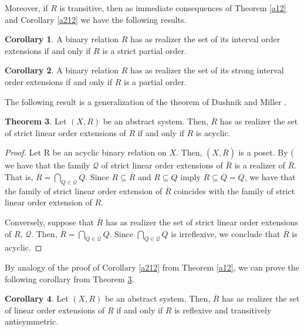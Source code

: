 \documentclass{article}
\theoremstyle{definition}
\newtheorem{theorem}{Theorem}[section]
\newtheorem{corollary}[theorem]{Corollary}
\begin{document}
Moreover, if $R$ is transitive, then
as immediate consequences of Theorem \ref{a12} and Corollary \ref{a212} we have the following results.


\begin{corollary}\label{a72}
A binary relation $R$ has as realizer the set of its interval order extensions if and only if $R$ is a strict partial order.  
\end{corollary}

\begin{corollary}\label{a721}
A binary relation $R$ has as realizer the set of its strong interval order extensions if and only if $R$ is a partial order.  
\end{corollary}

The following result is 
a generalization of 
the theorem of Dushnik and Miller \cite{DM}.








\begin{theorem}\label{a572} Let $(X,R)$ be an abstract system. Then,
$\overline{R}$ has as realizer the set of strict linear order extensions of $R$ if and only if $R$ is acyclic.   
\end{theorem}
\begin{proof}
Let R be an acyclic binary relation on $X$.
Then, $(X,\overline{R})$ is a poset. By (\cite[Theorem 2.32]{DM}
we have that the family
$\mathcal{Q}$ of
strict linear order extensions of $\overline{R}$ is a realizer of $\overline{R}$. That is,
$\overline{R}=\displaystyle\bigcap_{Q\in \mathcal{Q}}Q$. 
Since $R\subseteq \overline{R}$ and $R\subseteq Q$ imply $\overline{R}\subseteq \overline{Q}=Q$,
we have that the family of strict linear order extension of $\overline{R}$ coincides with
the family of strict linear order extension of $R$.

Conversely, suppose that $\overline{R}$ has as realizer the set of strict linear order extensions
of $R$, $\mathcal{Q}$. Then,
$\overline{R}=\displaystyle\bigcap_{Q\in \mathcal{Q}}Q$. Since 
$\displaystyle\bigcap_{Q\in \mathcal{Q}}Q$ is irreflexive, we conclude that $\overline{R}$ is acyclic.
\end{proof}



By analogy of the proof of Corollary \ref{a212} from Theorem \ref{a12}, we can prove the following
corollary from Theorem \ref{a572}.


\begin{corollary}\label{b572} Let $(X,R)$ be an abstract system. Then,
$\overline{R}$ has as realizer the set of linear order extensions of $R$ if and only if $R$ is 
reflexive and transitively antisymmetric.   
\end{corollary}
\end{document}
